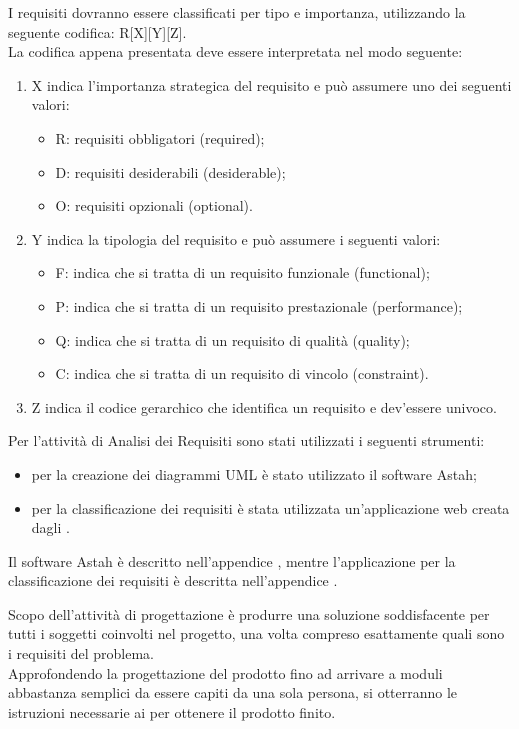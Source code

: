 					I requisiti dovranno essere classificati per tipo e importanza, utilizzando la seguente codifica: R[X][Y][Z].\\
					La codifica appena presentata deve essere interpretata nel modo seguente:
					\begin{enumerate}
						\item X indica l'importanza strategica del requisito e può assumere uno dei seguenti valori:
						\begin{itemize}
							\item R: requisiti obbligatori (required);
							\item D: requisiti desiderabili (desiderable);
							\item O: requisiti opzionali (optional).
						\end{itemize}
						\item Y indica la tipologia del requisito e può assumere i seguenti valori:
						\begin{itemize}
							\item F: indica che si tratta di un requisito funzionale (functional);
							\item P: indica che si tratta di un requisito prestazionale (performance);
							\item Q: indica che si tratta di un requisito di qualità (quality);
							\item C: indica che si tratta di un requisito di vincolo (constraint).
						\end{itemize}
						\item Z indica il codice gerarchico che identifica un requisito e dev'essere univoco.
					\end{enumerate}
			Per l'attività di Analisi dei Requisiti sono stati utilizzati i seguenti strumenti:
			\begin{itemize}
				\item per la creazione dei diagrammi UML è stato utilizzato il software Astah;
				\item per la classificazione dei requisiti è stata utilizzata un'applicazione web creata dagli .
			\end{itemize}
			Il software Astah è descritto nell'appendice , mentre l'applicazione per la classificazione dei requisiti è descritta nell'appendice .
			
Scopo dell'attività di progettazione è produrre una soluzione soddisfacente per tutti i soggetti coinvolti nel progetto, una volta compreso esattamente quali sono i requisiti del problema. \\
Approfondendo la progettazione del prodotto fino ad arrivare a moduli abbastanza semplici da essere capiti da una sola persona, si otterranno le istruzioni necessarie ai  per ottenere il prodotto finito.
			
